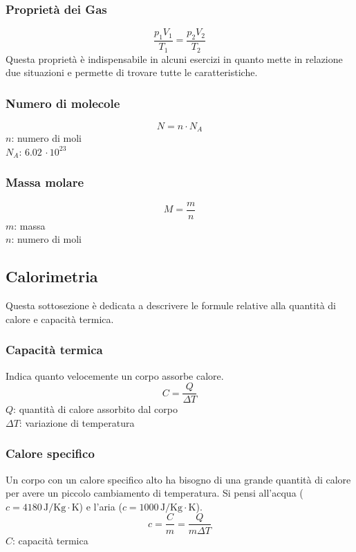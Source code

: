 \subsubsection{Proprietà dei Gas}
\begin{equation*}
\frac{p_1V_1}{T_1} = \frac{p_2V_2}{T_2}
\end{equation*}
Questa proprietà è indispensabile in alcuni esercizi in quanto mette in relazione due situazioni e
permette di trovare tutte le caratteristiche.

\subsubsection{Numero di molecole}
\begin{equation*}
N = n \cdot N_A
\end{equation*}
$n$: numero di moli\\
\hyperref[tab:Na]{$N_A$}: $6.02\,\cdot10^{23}$

\subsubsection{Massa molare}
\begin{equation*}
M = \frac{m}{n}
\end{equation*}
$m$: massa\\
$n$: numero di moli

\subsection{Calorimetria}
Questa sottosezione è dedicata a descrivere le formule relative alla quantità di calore e capacità
termica.

\subsubsection{Capacità termica}
Indica quanto velocemente un corpo assorbe calore.
\begin{equation*}
C = \frac{Q}{\Delta T}
\end{equation*}
$Q$: quantità di calore assorbito dal corpo\\
$\Delta T$: variazione di temperatura\\

\subsubsection{Calore specifico}
Un corpo con un calore specifico alto ha bisogno di una grande quantità di calore per avere un piccolo
cambiamento di temperatura. Si pensi all'acqua ($c=4180\,\text{J/Kg}\cdot\text{K}$) e l'aria
($c=1000\,\text{J/Kg}\cdot\text{K}$).
\begin{equation*}
c = \frac{C}{m} = \frac{Q}{m\Delta T}
\end{equation*}
$C$: capacità termica

